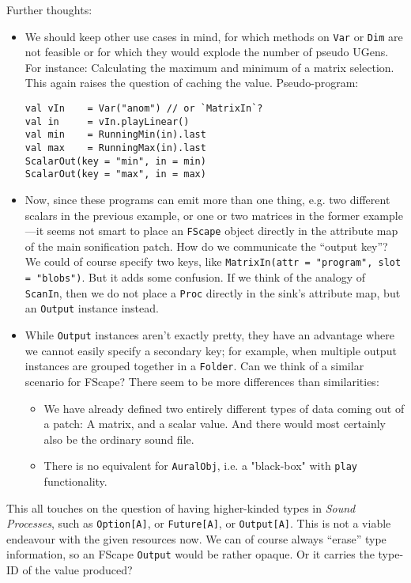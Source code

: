 \documentclass[11pt,a4paper]{article}
\newcommand{\software}[1]{\textit{#1}}
\begin{document}
Further thoughts:
%
\begin{itemize}
\item We should keep other use cases in mind, for which methods on \Verb!Var! or \Verb!Dim! are not feasible or for which they would explode the number of pseudo UGens. For instance: Calculating the maximum and minimum of a matrix selection. This again raises the question of caching the value. Pseudo-program:
%
\begin{lstlisting}[style=scala]
val vIn    = Var("anom") // or `MatrixIn`?
val in     = vIn.playLinear()
val min    = RunningMin(in).last
val max    = RunningMax(in).last
ScalarOut(key = "min", in = min)
ScalarOut(key = "max", in = max)
\end{lstlisting}
%
\item Now, since these programs can emit more than one thing, e.g. two different scalars in the previous example, or one or two matrices in the former example---it seems not smart to place an \Verb!FScape! object directly in the attribute map of the main sonification patch. How do we communicate the ``output key''? We could of course specify two keys, like \Verb!MatrixIn(attr = "program", slot = "blobs")!. But it adds some confusion. If we think of the analogy of \Verb!ScanIn!, then we do not place a \Verb!Proc! directly in the sink's attribute map, but an \Verb!Output! instance instead.

\item While \Verb!Output! instances aren't exactly pretty, they have an advantage where we cannot easily specify a secondary key; for example, when multiple output instances are grouped together in a \Verb!Folder!.
Can we think of a similar scenario for FScape? There seem to be more differences than similarities:
%
\begin{itemize}
\item We have already defined two entirely different types of data coming out of a patch: A matrix, and a scalar value. And there would most certainly also be the ordinary sound file.
\item There is no equivalent for \Verb!AuralObj!, i.e. a "black-box" with \Verb!play! functionality.
\end{itemize}
\end{itemize}
%
This all touches on the question of having higher-kinded types in \software{Sound\,Processes}, such as \Verb!Option[A]!, or \Verb!Future[A]!, or \Verb!Output[A]!. This is not a viable endeavour with the given resources now. We can of course always ``erase'' type information, so an FScape \Verb!Output! would be rather opaque. Or it carries the type-ID of the value produced?
\end{document}
